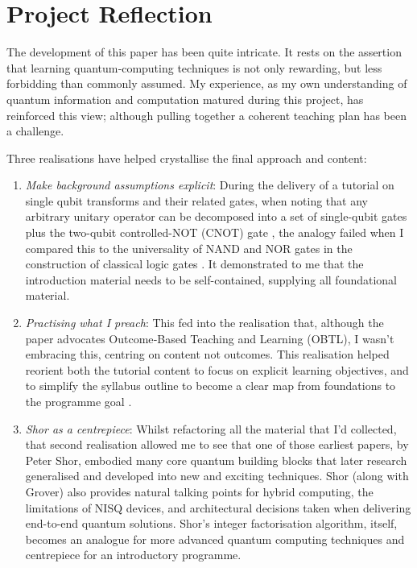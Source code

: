 \section{Project Reflection}

The development of this paper has been quite intricate.  
It rests on the assertion that learning quantum‑computing techniques 
is not only rewarding, but less forbidding than commonly assumed.
My experience, as my own understanding of quantum information and computation matured during this project, 
has reinforced this view; although pulling together a coherent teaching plan has been a challenge.

Three realisations have helped crystallise the final approach and content:
\begin{enumerate}
\item \emph{Make background assumptions explicit}: 
During the delivery of a tutorial on single qubit transforms and their related gates,
when noting that any arbitrary unitary operator can be decomposed 
into a set of single-qubit gates plus the two-qubit controlled-NOT (CNOT) gate \cite{Nielsen:2010},
the analogy failed when I compared this to the universality of NAND and NOR gates 
in the construction of classical logic gates \cite{Wikipedia:UniversalLogicGates}.
It demonstrated to me that the introduction material needs to be self-contained,
supplying all foundational material.

\item \emph{Practising what I preach}: This fed into the realisation that, 
although the paper advocates Outcome‑Based Teaching and Learning (OBTL), 
I wasn't embracing this, centring on content not outcomes.  
This realisation helped reorient both the tutorial content to focus on explicit learning objectives,
and to simplify the syllabus outline to become a clear map from foundations to the programme goal \cite{Wong:2011}.

\item \emph{Shor as a centrepiece}: Whilst refactoring all the material that I'd collected, 
that second realisation allowed me to see that one of those earliest papers, by Peter Shor, 
embodied many core quantum building blocks that later research generalised and developed into new and exciting techniques. 
Shor (along with Grover) also provides natural talking points for hybrid computing, the limitations of NISQ devices, 
and architectural decisions taken when delivering end-to-end quantum solutions.  
Shor's integer factorisation algorithm, itself, becomes an analogue for more advanced quantum computing techniques
and centrepiece for an introductory programme.
\end{enumerate}